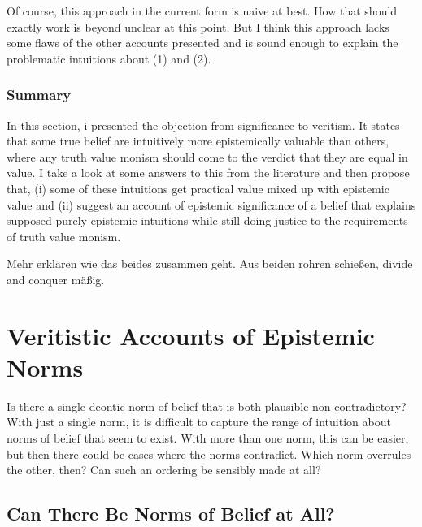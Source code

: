 \documentclass[12pt,numbers=noenddot]{scrartcl}
\begin{document}
Of course, this approach in the current form is naive at best. How that should exactly work is beyond unclear at this point. But I think this approach lacks some flaws of the other accounts presented and is sound enough to explain the problematic intuitions about (1) and (2).


\subsubsection{Summary}
In this section, i presented the objection from significance to veritism. It states that some true belief are intuitively more epistemically valuable than others, where any truth value monism should come to the verdict that they are equal in value. I take a look at some answers to this from the literature and then propose that, (i) some of these intuitions get practical value mixed up with epistemic value and (ii) suggest an account of epistemic significance of a belief that explains supposed purely epistemic intuitions while still doing justice to the requirements of truth value monism.


Mehr erklären wie das beides zusammen geht. Aus beiden rohren schießen, divide and conquer mäßig.

\clearpage
\section{Veritistic Accounts of Epistemic Norms}

Is there a single deontic norm of belief that is both plausible non-contradictory? With just a single norm, it is difficult to capture the range of intuition about norms of belief that seem to exist. With more than one norm, this can be easier, but then there could be cases where the norms contradict. Which norm overrules the other, then? Can such an ordering be sensibly made at all?

\subsection{Can There Be Norms of Belief at All?}
\end{document}
